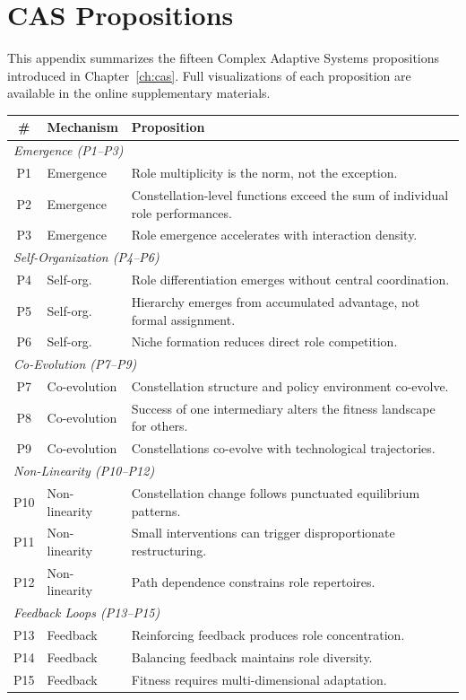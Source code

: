 \documentclass[../main.tex]{subfiles}
\begin{document}
\chapter{CAS Propositions}

This appendix summarizes the fifteen Complex Adaptive Systems propositions
introduced in Chapter~\ref{ch:cas}. Full visualizations of each proposition
are available in the online supplementary materials.

\tableminimal
\begin{center}
\small
\begin{tabular}{@{}clp{8cm}@{}}
\toprule
\textbf{\#} & \textbf{Mechanism} & \textbf{Proposition} \\
\midrule
\multicolumn{3}{l}{\textit{Emergence (P1--P3)}} \\[0.3em]
P1 & Emergence & Role multiplicity is the norm, not the exception. \\
P2 & Emergence & Constellation-level functions exceed the sum of individual role performances. \\
P3 & Emergence & Role emergence accelerates with interaction density. \\[0.3em]
\multicolumn{3}{l}{\textit{Self-Organization (P4--P6)}} \\[0.3em]
P4 & Self-org. & Role differentiation emerges without central coordination. \\
P5 & Self-org. & Hierarchy emerges from accumulated advantage, not formal assignment. \\
P6 & Self-org. & Niche formation reduces direct role competition. \\[0.3em]
\multicolumn{3}{l}{\textit{Co-Evolution (P7--P9)}} \\[0.3em]
P7 & Co-evolution & Constellation structure and policy environment co-evolve. \\
P8 & Co-evolution & Success of one intermediary alters the fitness landscape for others. \\
P9 & Co-evolution & Constellations co-evolve with technological trajectories. \\[0.3em]
\multicolumn{3}{l}{\textit{Non-Linearity (P10--P12)}} \\[0.3em]
P10 & Non-linearity & Constellation change follows punctuated equilibrium patterns. \\
P11 & Non-linearity & Small interventions can trigger disproportionate restructuring. \\
P12 & Non-linearity & Path dependence constrains role repertoires. \\[0.3em]
\multicolumn{3}{l}{\textit{Feedback Loops (P13--P15)}} \\[0.3em]
P13 & Feedback & Reinforcing feedback produces role concentration. \\
P14 & Feedback & Balancing feedback maintains role diversity. \\
P15 & Feedback & Fitness requires multi-dimensional adaptation. \\
\bottomrule
\end{tabular}
\label{tab:cas-propositions-summary}
\end{center}

\clearpage
\end{document}
